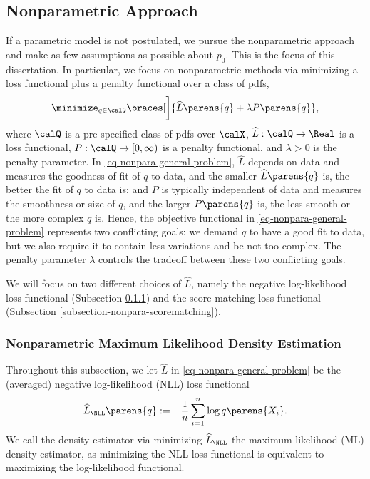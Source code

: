 \documentclass[12pt]{article}
\theoremstyle{definition}
\theoremstyle{theorem}
\theoremstyle{remark}
\begin{document}
\subsection{Nonparametric Approach}\label{section-nonparam-approach}

If a parametric model is not postulated, we pursue the nonparametric approach and make as few assumptions as possible about $p_0$. This is the focus of this dissertation. In particular, we focus on nonparametric methods via minimizing a loss functional plus a penalty functional over a class of pdfs, 
\begin{align}\label{eq-nonpara-general-problem} 
		\minimize_{q \in \calQ} \braces[\bigg]{ \widehat{L} \parens{q} + \lambda P \parens{q} }, 
\end{align}
where $\calQ$ is a pre-specified class of pdfs over $\calX$, $\widehat{L}: \calQ \to \Real$ is a loss functional, $P: \calQ \to [0, \infty)$ is a penalty functional, and $\lambda > 0$ is the penalty parameter. In \eqref{eq-nonpara-general-problem}, $\widehat{L}$ depends on data and measures the goodness-of-fit of $q$ to data, and the smaller $\widehat{L} \parens{q}$ is, the better the fit of $q$ to data is; and $P$ is typically independent of data and measures the smoothness or size of $q$, and the larger $P \parens{q}$ is, the less smooth or the more complex $q$ is. Hence, the objective functional in \eqref{eq-nonpara-general-problem} represents two conflicting goals: we demand $q$ to have a good fit to data, but we also require it to contain less variations and be not too complex. The penalty parameter $\lambda$ controls the tradeoff between these two conflicting goals. 

We will focus on two different choices of $\widehat{L}$, namely the negative log-likelihood loss functional (Subsection \ref{subsection-nonpara-mle}) and the score matching loss functional (Subsection \ref{subsection-nonpara-scorematching}). 

\subsubsection{Nonparametric Maximum Likelihood Density Estimation}\label{subsection-nonpara-mle}

Throughout this subsection, we let $\widehat{L}$ in \eqref{eq-nonpara-general-problem} be the (averaged) negative log-likelihood (NLL) loss functional 
\begin{align}\label{eq-nll-loss-function}
	\widehat{L}_{\NLL} \parens{q} := - \frac{1}{n} \sum_{i=1}^n \log q \parens{X_i}. 
\end{align}
We call the density estimator via minimizing $\widehat{L}_{\NLL}$ the maximum likelihood (ML) density estimator, as minimizing the NLL loss functional is equivalent to maximizing the log-likelihood functional. 
\end{document}
